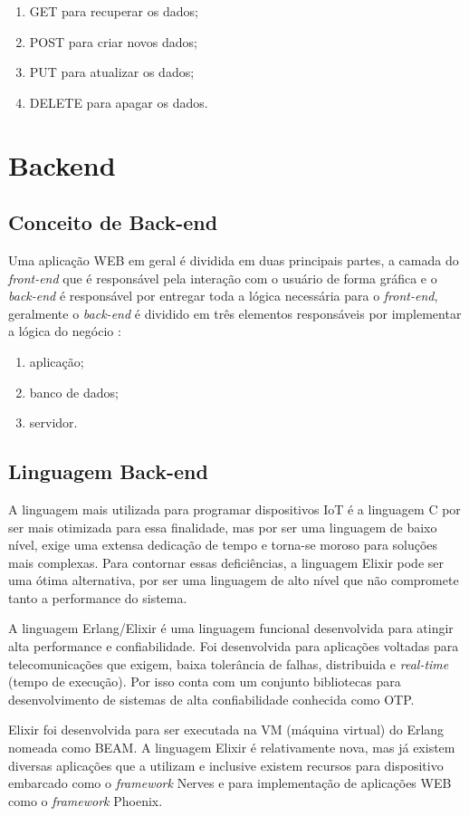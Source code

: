 \documentclass[../../layout.tex]{subfiles}
\begin{document}
\begin{enumerate}[label=\alph*)]
\itemsep0em
    \item GET para recuperar os dados;
    \item POST para criar novos dados;
    \item PUT para atualizar os dados;
    \item DELETE para apagar os dados.
\end{enumerate}

\section{Backend}
\subsection{Conceito de Back-end}
\hspace*{3em}Uma aplicação WEB em geral é dividida  em duas principais partes, a camada do \emph{front-end} que é responsável pela interação com o usuário de forma gráfica e o \emph{back-end} é responsável por entregar toda a lógica necessária para o \emph{front-end}, geralmente o \emph{back-end} é dividido em três elementos responsáveis por implementar a lógica do negócio \cite{16}:

\begin{enumerate}[label=\alph*)]
\itemsep0em
    \item aplicação;
    \item banco de dados;
    \item servidor.
\end{enumerate}

\subsection{Linguagem Back-end}
\hspace*{3em}A linguagem mais utilizada para programar dispositivos IoT é a linguagem C por ser mais otimizada para essa finalidade, mas por ser uma linguagem de baixo nível, exige uma extensa dedicação de tempo e torna-se moroso para soluções mais complexas. Para contornar essas deficiências, a linguagem Elixir pode ser uma ótima alternativa, por ser uma linguagem de alto nível que não compromete tanto a performance do sistema.\par
A linguagem Erlang/Elixir é uma linguagem funcional desenvolvida para atingir alta performance e confiabilidade. Foi desenvolvida para aplicações voltadas para telecomunicações que exigem, baixa tolerância de falhas, distribuida e \emph{real-time} (tempo de execução). Por isso conta com um conjunto bibliotecas para desenvolvimento de sistemas de alta confiabilidade conhecida como OTP.\par
Elixir foi desenvolvida para ser executada na VM (máquina virtual) do Erlang nomeada como BEAM. A linguagem Elixir é relativamente nova, mas já existem diversas aplicações que a utilizam e inclusive existem recursos para dispositivo embarcado como o \emph{framework} Nerves \cite{ElixirorIoT} e para implementação de aplicações WEB como o \emph{framework} Phoenix.
\end{document}
